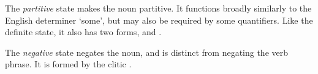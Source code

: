 \documentclass[grammar]{subfiles}
\begin{document}
  The \emph{partitive} state makes the noun partitive. 
  It functions broadly similarly to the English determiner ‘some’, but may also be required by some quantifiers. 
  Like the definite state, it also has two forms,  and .   

  The \emph{negative} state negates the noun, and is distinct from negating the verb phrase. 
  It is formed by the clitic . 






\end{document}

